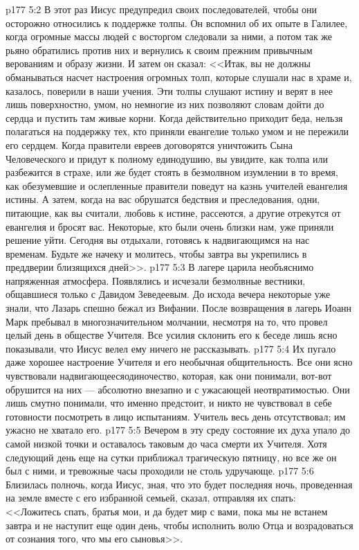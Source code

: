 \vs p177 5:2 В этот раз Иисус предупредил своих последователей, чтобы они осторожно относились к поддержке толпы. Он вспомнил об их опыте в Галилее, когда огромные массы людей с восторгом следовали за ними, а потом так же рьяно обратились против них и вернулись к своим прежним привычным верованиям и образу жизни. И затем он сказал: <<Итак, вы не должны обманываться насчет настроения огромных толп, которые слушали нас в храме и, казалось, поверили в наши учения. Эти толпы слушают истину и верят в нее лишь поверхностно, умом, но немногие из них позволяют словам дойти до сердца и пустить там живые корни. Когда действительно приходит беда, нельзя полагаться на поддержку тех, кто приняли евангелие только умом и не пережили его сердцем. Когда правители евреев договорятся уничтожить Сына Человеческого и придут к полному единодушию, вы увидите, как толпа или разбежится в страхе, или же будет стоять в безмолвном изумлении в то время, как обезумевшие и ослепленные правители поведут на казнь учителей евангелия истины. А затем, когда на вас обрушатся бедствия и преследования, одни, питающие, как вы считали, любовь к истине, рассеются, а другие отрекутся от евангелия и бросят вас. Некоторые, кто были очень близки нам, уже приняли решение уйти. Сегодня вы отдыхали, готовясь к надвигающимся на нас временам. Будьте же начеку и молитесь, чтобы завтра вы укрепились в преддверии близящихся дней>>.
\vs p177 5:3 В лагере царила необъяснимо напряженная атмосфера. Появлялись и исчезали безмолвные вестники, общавшиеся только с Давидом Зеведеевым. До исхода вечера некоторые уже знали, что Лазарь спешно бежал из Вифании. После возвращения в лагерь Иоанн Марк пребывал в многозначительном молчании, несмотря на то, что провел целый день в обществе Учителя. Все усилия склонить его к беседе лишь ясно показывали, что Иисус велел ему ничего не рассказывать.
\vs p177 5:4 Их пугало даже хорошее настроение Учителя и его необычная общительность. Все они ясно чувствовали надвигающеесяодиночество, которая, как они понимали, вот\hyp{}вот обрушится на них --- абсолютно внезапно и с ужасающей неотвратимостью. Они лишь смутно понимали, что именно предстоит, и никто не чувствовал в себе готовности посмотреть в лицо испытаниям. Учитель весь день отсутствовал; им ужасно не хватало его.
\vs p177 5:5 Вечером в эту среду состояние их духа упало до самой низкой точки и оставалось таковым до часа смерти их Учителя. Хотя следующий день еще на сутки приближал трагическую пятницу, но все же он был с ними, и тревожные часы проходили не столь удручающе.
\vs p177 5:6 Близилась полночь, когда Иисус, зная, что это будет последняя ночь, проведенная на земле вместе с его избранной семьей, сказал, отправляя их спать: <<Ложитесь спать, братья мои, и да будет мир с вами, пока мы не встанем завтра и не наступит еще один день, чтобы исполнить волю Отца и возрадоваться от сознания того, что мы его сыновья>>.
